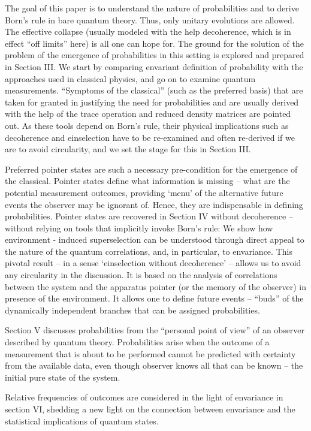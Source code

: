 \documentclass[aps,pra,epsfig,11pt,floatfix]{revtex4}
\begin{document}
The goal of this paper is to understand the nature of probabilities 
and to derive Born's rule in bare quantum theory. Thus, only unitary 
evolutions are allowed. The effective collapse (usually modeled 
with the help decoherence, which is in effect  ``off limits'' here) is all
one can hope for. The ground for the solution of the problem of the emergence
of probabilities in this setting is explored and prepared in Section III.
We start by comparing envariant definition of probability with the approaches
used in classical physics, and go on to examine quantum measurements.
``Symptoms of the classical''  (such as the preferred basis) that are taken 
for granted in justifying the need for probabilities and are usually derived with
the help of the trace operation and reduced density matrices are pointed out. 
As these tools depend on Born's rule, their physical implications such as 
decoherence and einselection have to be re-examined and often re-derived 
if we are to avoid circularity, and we set the stage for this in Section III.

Preferred pointer states are such a necessary pre-condition for the emergence
of the classical. Pointer states define what information is missing -- what are 
the potential measurement outcomes, providing `menu' of the alternative future 
events the observer may be ignorant of. Hence, they are indispensable in defining
probabilities. Pointer states are recovered in Section IV without decoherence
-- without relying on tools that implicitly invoke Born's rule: We show how
environment - induced superselection can be understood through direct appeal 
to the nature of the quantum correlations, and, in particular, to envariance. 
This pivotal result -- in a sense `einselection without decoherence' -- allows us 
to avoid any circularity in the discussion. It is based on the analysis
of correlations between the system and the apparatus pointer (or the memory
of the observer) in presence of the environment. It allows one to define future
events --  ``buds'' of the dynamically independent branches that can be assigned
probabilities.

Section V discusses probabilities from the ``personal point of view'' of 
an observer described by quantum theory.  Probabilities arise when 
the outcome of a measurement that is about to be performed cannot 
be predicted with certainty from the available data, even though observer 
knows all that can be known -- the initial pure state of the system.  

Relative frequencies of outcomes are considered
in the light of envariance in section VI, shedding a new light on
the connection between envariance and the statistical implications
of quantum states.
\end{document}
